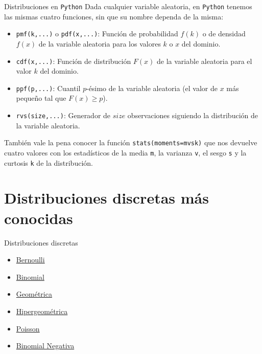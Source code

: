 \documentclass[
  ignorenonframetext,
]{beamer}
\providecommand{\tightlist}{%
  \setlength{\itemsep}{0pt}\setlength{\parskip}{0pt}}
\begin{document}
\begin{frame}[fragile]{Distribuciones en \texttt{Python}}
\protect\hypertarget{distribuciones-en-python}{}
Dada cualquier variable aleatoria, en \texttt{Python} tenemos las mismas
cuatro funciones, sin que su nombre dependa de la misma:

\begin{itemize}
\tightlist
\item
  \texttt{pmf(k,...)} o \texttt{pdf(x,...)}: Función de probabilidad
  \(f(k)\) o de densidad \(f(x)\) de la variable aleatoria para los
  valores \(k\) o \(x\) del dominio.
\item
  \texttt{cdf(x,...)}: Función de distribución \(F(x)\) de la variable
  aleatoria para el valor \(k\) del dominio.
\item
  \texttt{ppf(p,...)}: Cuantil \(p\)-ésimo de la variable aleatoria (el
  valor de \(x\) más pequeño tal que \(F(x)\geq p\)).
\item
  \texttt{rvs(size,...)}: Generador de \(size\) observaciones siguiendo
  la distribución de la variable aleatoria.
\end{itemize}

También vale la pena conocer la función
\texttt{stats(moments=\textquotesingle{}mvsk\textquotesingle{})} que nos
devuelve cuatro valores con los estadísticos de la media \texttt{m}, la
varianza \texttt{v}, el sesgo \texttt{s} y la curtosis \texttt{k} de la
distribución.
\end{frame}

\hypertarget{distribuciones-discretas-muxe1s-conocidas}{%
\section{Distribuciones discretas más
conocidas}\label{distribuciones-discretas-muxe1s-conocidas}}

\begin{frame}{Distribuciones discretas}
\protect\hypertarget{distribuciones-discretas}{}
\begin{itemize}
\tightlist
\item
  \href{https://es.wikipedia.org/wiki/Distribución_de_Bernoulli}{Bernoulli}
\item
  \href{https://es.wikipedia.org/wiki/Distribución_binomial}{Binomial}
\item
  \href{https://es.wikipedia.org/wiki/Distribución_geométrica}{Geométrica}
\item
  \href{https://es.wikipedia.org/wiki/Distribución_hipergeométrica}{Hipergeométrica}
\item
  \href{https://es.wikipedia.org/wiki/Distribución_de_Poisson}{Poisson}
\item
  \href{https://es.wikipedia.org/wiki/Distribución_binomial_negativa}{Binomial
  Negativa}
\end{itemize}
\end{frame}
\end{document}
